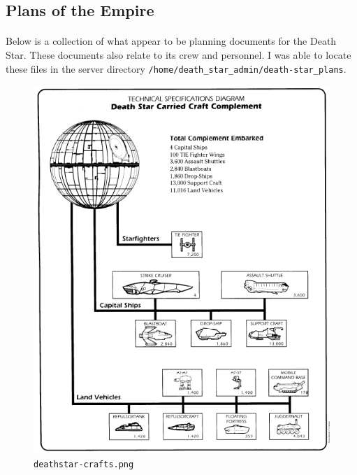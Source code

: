 \documentclass{article}
\begin{document}
\newpage

\subsection{Plans of the Empire}
\paragraph{}
Below is a collection of what appear to be planning documents for the Death Star. These documents also relate to its crew and personnel. I was able to locate these files in the server directory \texttt{/home/death\_star\_admin/death-star\_plans}.

\begin{figure}[H]
	\includegraphics[width=\linewidth]{resources/plans/deathstar-crafts.png}
	\caption{\texttt{deathstar-crafts.png}}
	\label{fig:deathstar-crafts}
\end{figure}
\end{document}
